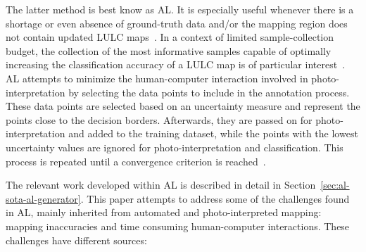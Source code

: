 The latter method is best know as AL\@. It is especially useful whenever there
is a shortage or even absence of ground-truth data and/or the mapping region
does not contain updated LULC maps~\cite{Su2020}. In a context of limited
sample-collection budget, the collection of the most informative samples
capable of optimally increasing the classification accuracy of a LULC map is
of particular interest~\cite{Su2020}. AL attempts to minimize the
human-computer interaction involved in photo-interpretation by selecting the
data points to include in the annotation process. These data points are
selected based on an uncertainty measure and represent the points close to the
decision borders. Afterwards, they are passed on for photo-interpretation and
added to the training dataset, while the points with the lowest uncertainty
values are ignored for photo-interpretation and classification. This process
is repeated until a convergence criterion is reached~\cite{Pasolli2016}. 

The relevant work developed within AL is described in detail in
Section~\ref{sec:al-sota-al-generator}. This paper attempts to address some of the
challenges found in AL, mainly inherited from automated and photo-interpreted
mapping: mapping inaccuracies and time consuming human-computer interactions.
These challenges have different sources:

